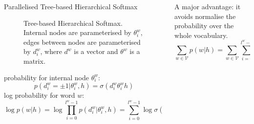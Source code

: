 \documentclass[final,t,unknownkeysallowed]{beamer}
\begin{document}
\begin{frame}{}
\begin{columns}[t]
\begin{column}{.3\linewidth}
      \begin{block}{Parallelised Tree-based Hierarchical Softmax}
      \begin{figure}
      \caption{Tree-based Hierarchical Softmax. Internal nodes are parameterised by $\theta_i^w$, edges between nodes are parameterised by $d_i^w$, where $d^w$ is a vector and $\theta^w$ is a matrix.}
      \end{figure}
	probability for internal node $\theta_i^w$:
	\begin{equation}
    p(d^w_i=\pm 1|\theta_{i}^w,h) = \sigma({d_i^w}\theta_{i}^w h)
    \end{equation}
    log probability for word $w$:
    \begin{equation}
    \log p(w|h)=\log\prod_{i=0}^{l^w-1} p(d^w_i|\theta_{i}^w,h) = \sum_{i=0}^{l^w -1} \log\sigma(d_i^w \theta_{i}^w h)=\log\sigma({d^w}^\top \theta^w h)
    \end{equation}

    
    \end{block}
    \end{column}


    \begin{column}{.3\linewidth}
    
    A major advantage: it avoids normalise the probability over the whole vocabulary.
\begin{equation}
\sum_{w\in \mathcal{V}}{p(w|h)}=\sum_{w \in \mathcal{V}}\sum_{i=0}^{l^w-1}{\sigma(d_i^w\theta_{i}^w h)}=1.
\end{equation}


\end{column}
\end{columns}
\end{frame}
\end{document}
